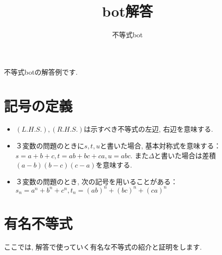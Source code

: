 \documentclass[uplatex, a5paper]{jsarticle}
\title{bot解答}
\author{不等式bot}
\theoremstyle{definition}
\begin{document}
\maketitle

不等式botの解答例です.



\section{記号の定義}


\begin{itemize}
 \item $(L.H.S.),(R.H.S.)$は示すべき不等式の左辺, 右辺を意味する.
 \item ３変数の問題のときに$s,t,u$と書いた場合, 基本対称式を意味する：$s=a+b+c,t=ab+bc+ca,u=abc$. また$\Delta$と書いた場合は差積$(a-b)(b-c)(c-a)$を意味する.
 \item ３変数の問題のとき, 次の記号を用いることがある：$s_n=a^n+b^n+c^n , t_n=(ab)^n+(bc)^n+(ca)^n$
\end{itemize}







\section{有名不等式}
ここでは, 解答で使っていく有名な不等式の紹介と証明をします.
\end{document}
